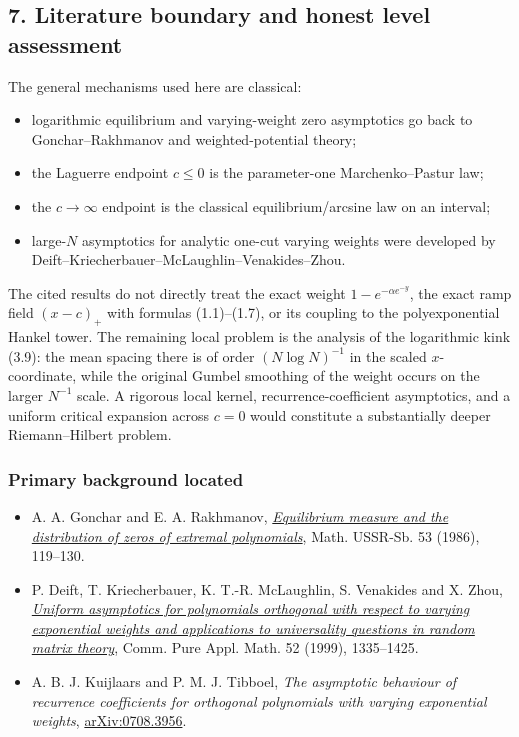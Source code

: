 \documentclass[11pt]{article}
\theoremstyle{keio}
\theoremstyle{definition}
\theoremstyle{remark}
\providecommand{\tightlist}{\setlength{\itemsep}{0pt}\setlength{\parskip}{0pt}}
\begin{document}
\subsection{7. Literature boundary and honest level assessment}

The general mechanisms used here are classical:

\begin{itemize}
\tightlist
\item
  logarithmic equilibrium and varying-weight zero asymptotics go back to
  Gonchar--Rakhmanov and weighted-potential theory;
\item
  the Laguerre endpoint \(c\le0\) is the parameter-one
  Marchenko--Pastur law;
\item
  the \(c\to\infty\) endpoint is the classical equilibrium/arcsine law on
  an interval;
\item
  large-\(N\) asymptotics for analytic one-cut varying weights were
  developed by Deift--Kriecherbauer--McLaughlin--Venakides--Zhou.
\end{itemize}

The cited results do not directly treat the exact weight
\(1-e^{-\alpha e^{-y}}\), the exact ramp field \((x-c)_+\) with formulas
(1.1)--(1.7), or its coupling to the polyexponential Hankel tower.  The
remaining local problem is the analysis of the logarithmic kink (3.9): the
mean spacing there is of
order \((N\log N)^{-1}\) in the scaled \(x\)-coordinate, while the original
Gumbel smoothing of the weight occurs on the larger \(N^{-1}\) scale.
A rigorous local kernel, recurrence-coefficient asymptotics, and a uniform
critical expansion across \(c=0\) would constitute a substantially deeper
Riemann--Hilbert problem.

\subsubsection{Primary background located}

\begin{itemize}
\tightlist
\item
  A. A. Gonchar and E. A. Rakhmanov, \href{https://ui.adsabs.harvard.edu/abs/1986SbMat..53..119G}{\emph{Equilibrium measure and the
  distribution of zeros of extremal polynomials}},
  Math. USSR-Sb. 53 (1986), 119--130.
\item
  P. Deift, T. Kriecherbauer, K. T.-R. McLaughlin, S. Venakides and
  X. Zhou, \href{https://doi.org/10.1002/(SICI)1097-0312(199911)52:11\%3C1335::AID-CPA1\%3E3.0.CO;2-1}{\emph{Uniform asymptotics for polynomials orthogonal with respect to
  varying exponential weights and applications to universality questions
  in random matrix theory}},
  Comm. Pure Appl. Math. 52 (1999), 1335--1425.
\item
  A. B. J. Kuijlaars and P. M. J. Tibboel, \emph{The asymptotic behaviour of
  recurrence coefficients for orthogonal polynomials with varying
  exponential weights}, \href{https://arxiv.org/abs/0708.3956}{arXiv:0708.3956}.
\end{itemize}
\end{document}
